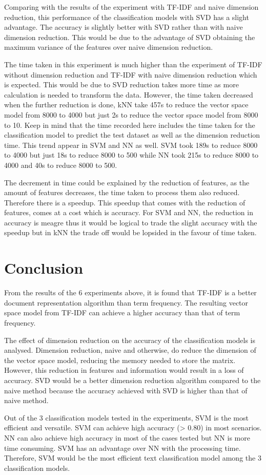 Comparing with the results of the experiment with TF-IDF and naive dimension reduction, this performance of the classification models with SVD has a slight advantage. The accuracy is slightly better with SVD rather than with naive dimension reduction. This would be due to the advantage of SVD obtaining the maximum variance of the features over naive dimension reduction.

The time taken in this experiment is much higher than the experiment of TF-IDF without dimension reduction and TF-IDF with naive dimension reduction which is expected. This would be due to SVD reduction takes more time as more calculation is needed to transform the data. However, the time taken decreased when the further reduction is done, kNN take 457s to reduce the vector space model from 8000 to 4000 but just 2s to reduce the vector space model from 8000 to 10. Keep in mind that the time recorded here includes the time taken for the classification model to predict the test dataset as well as the dimension reduction time. This trend appear in SVM and NN as well. SVM took 189s to reduce 8000 to 4000 but just 18s to reduce 8000 to 500 while NN took 215s to reduce 8000 to 4000 and 40s to reduce 8000 to 500. 

The decrement in time could be explained by the reduction of features, as the amount of features decreases, the time taken to process them also reduced. Therefore there is a speedup. This speedup that comes with the reduction of features, comes at a cost which is accuracy. For SVM and NN, the reduction in accuracy is meagre thus it would be logical to trade the slight accuracy with the speedup but in kNN the trade off would be lopsided in the favour of time taken.\\

\clearpage
\section{Conclusion}
From the results of the 6 experiments above, it is found that TF-IDF is a better document representation algorithm than term frequency. The resulting vector space model from TF-IDF can achieve a higher accuracy than that of term frequency. 

The effect of dimension reduction on the accuracy of the classification models is analysed. Dimension reduction, naive and otherwise, do reduce the dimension of the vector space model, reducing the memory needed to store the matrix. However, this reduction in features and information would result in a loss of accuracy. SVD would be a better dimension reduction algorithm compared to the naive method because the accuracy achieved with SVD is higher than that of naive method.

Out of the 3 classification models tested in the experiments, SVM is the most efficient and versatile. SVM can achieve high accuracy (> 0.80) in most scenarios. NN can also achieve high accuracy in most of the cases tested but NN is more time consuming. SVM has an advantage over NN with the processing time. Therefore, SVM would be the most efficient text classification model among the 3 classification models.


